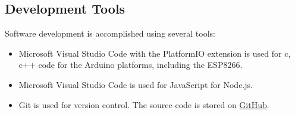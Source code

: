 \subsection{Development Tools}
Software development is accomplished using several tools:
\begin{itemize}
\item Microsoft Visual Studio Code with the PlatformIO extension is used for c, c++ code for the Arduino platforms, including the ESP8266.
\item Microsoft Visual Studio Code is used for JavaScript for Node.js.
\item Git is used for version control. The source code is stored on \href{https://github.com/djbristow/RAILS}{GitHub}.
\end{itemize}
